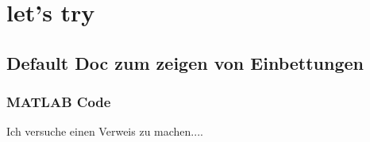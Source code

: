 \chapter{let's try}
\section{Default Doc zum zeigen von Einbettungen}
\label{sec:defaultDoc}

\subsection{MATLAB Code}
\lstset{language=Matlab, numbers=left}

Ich versuche einen Verweis zu machen....\cite{wikipedia}


